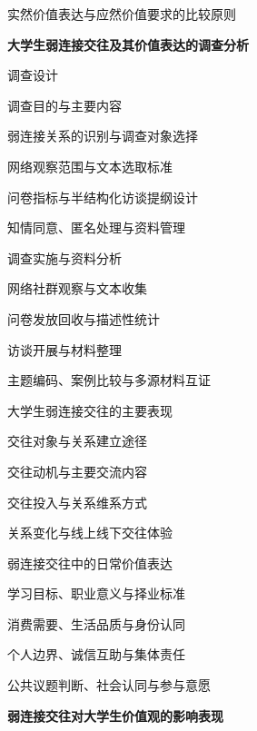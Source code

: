 \begin{thesisframework}
\begin{thesisoutline}
\begin{thesisoutline}
\begin{thesisoutline}
      \item 实然价值表达与应然价值要求的比较原则
    \end{thesisoutline}
  \end{thesisoutline}
  \item \textbf{大学生弱连接交往及其价值表达的调查分析}
  \begin{thesisoutline}
    \item 调查设计
    \begin{thesisoutline}
      \item 调查目的与主要内容
      \item 弱连接关系的识别与调查对象选择
      \item 网络观察范围与文本选取标准
      \item 问卷指标与半结构化访谈提纲设计
      \item 知情同意、匿名处理与资料管理
    \end{thesisoutline}
    \item 调查实施与资料分析
    \begin{thesisoutline}
      \item 网络社群观察与文本收集
      \item 问卷发放回收与描述性统计
      \item 访谈开展与材料整理
      \item 主题编码、案例比较与多源材料互证
    \end{thesisoutline}
    \item 大学生弱连接交往的主要表现
    \begin{thesisoutline}
      \item 交往对象与关系建立途径
      \item 交往动机与主要交流内容
      \item 交往投入与关系维系方式
      \item 关系变化与线上线下交往体验
    \end{thesisoutline}
    \item 弱连接交往中的日常价值表达
    \begin{thesisoutline}
      \item 学习目标、职业意义与择业标准
      \item 消费需要、生活品质与身份认同
      \item 个人边界、诚信互助与集体责任
      \item 公共议题判断、社会认同与参与意愿
    \end{thesisoutline}
  \end{thesisoutline}
  \item \textbf{弱连接交往对大学生价值观的影响表现}

\end{thesisoutline}
\end{thesisframework}
